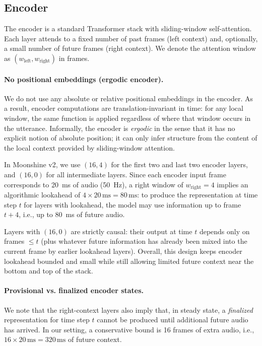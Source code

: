 \subsection{Encoder}
The encoder is a standard Transformer stack with sliding-window self-attention.
Each layer attends to a fixed number of past frames (left context) and,
optionally, a small number of future frames (right context). We denote the
attention window as $(w_\text{left}, w_\text{right})$ in frames.

\paragraph{No positional embeddings (ergodic encoder).}
We do not use any absolute or relative positional embeddings in the encoder. As
a result, encoder computations are translation-invariant in time: for any local
window, the same function is applied regardless of where that window occurs in
the utterance. Informally, the encoder is \emph{ergodic} in the sense that it
has no explicit notion of absolute position; it can only infer structure from
the content of the local context provided by sliding-window attention.

In Moonshine v2, we use $(16,4)$ for the first two and last two encoder layers,
and $(16,0)$ for all intermediate layers. Since each encoder input frame
corresponds to 20~ms of audio (50~Hz), a right window of $w_\text{right}=4$
implies an algorithmic lookahead of $4\times20\,\mathrm{ms}=80\,\mathrm{ms}$: to
produce the representation at time step $t$ for layers with lookahead, the model
may use information up to frame $t+4$, i.e., up to 80~ms of future audio.

Layers with $(16,0)$ are strictly causal: their output at time $t$ depends only
on frames $\leq t$ (plus whatever future information has already been mixed into
the current frame by earlier lookahead layers). Overall, this design keeps
encoder lookahead bounded and small while still allowing limited future context
near the bottom and top of the stack.

\paragraph{Provisional vs. finalized encoder states.}
We note that the right-context layers also imply that, in steady state, a
\emph{finalized} representation for time step $t$ cannot be produced until
additional future audio has arrived. In our setting, a conservative bound is 16
frames of extra audio, i.e., $16\times20\,\mathrm{ms}=320\,\mathrm{ms}$ of
future context.

